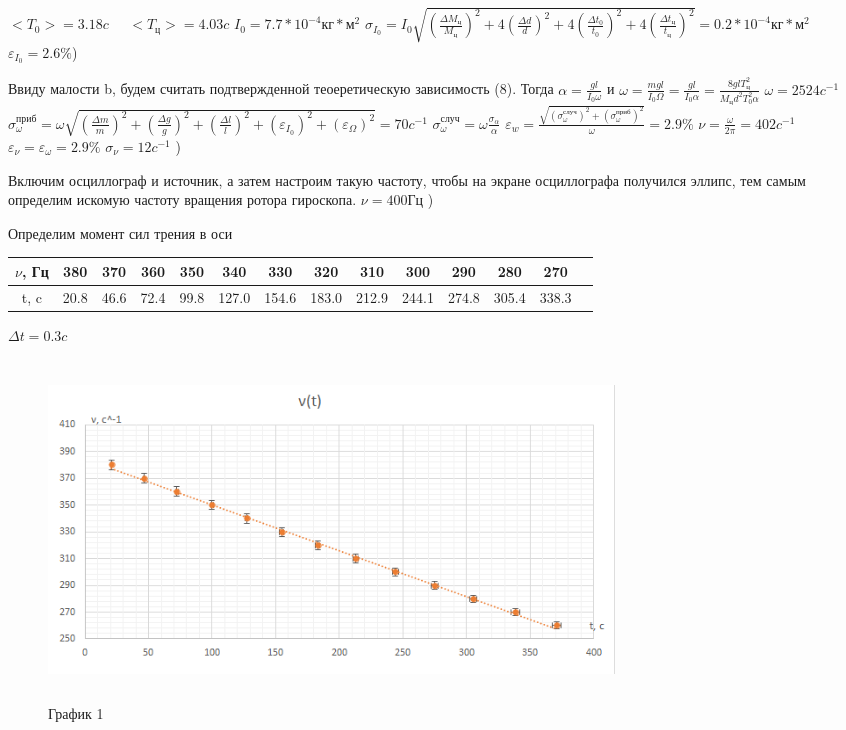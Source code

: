 \documentclass[12pt,a4paper]{article}
\begin{document}
$<T_{0}> = 3.18c \;\;\;\;\; <T_{\text{ц}}> = 4.03 c$ \hfill \break
$I_{0}=7.7*10^{-4}\text{кг}*\text{м}^2$ \hfill \break
$\sigma_{I_{0}}=I_{0}\sqrt{(\frac{\Delta{M_{\text{ц}}}}{M_{\text{ц}}})^2+4(\frac{\Delta{d}}{d})^2+4(\frac{\Delta{t_{0}}}{t_{0}})^2+4(\frac{\Delta{t_{\text{ц}}}}{t_{\text{ц}}})^2}=0.2*10^{-4}\text{кг}*\text{м}^2$ \hfill \break
$\varepsilon_{I_{0}}=2.6\%$\hfill \break {}) \par Ввиду малости b, будем считать подтвержденной теоеретическую зависимость (8). Тогда $\alpha=\frac{gl}{I_{\text{0}}\omega}$ и $\omega=\frac{mgl}{I_{\text{0}}\Omega}=\frac{gl}{I_{\text{0}}\alpha}=\frac{8glT^{2}_{\text{ц}}}{M_{\text{ц}}d^{2}T^{2}_{0}\alpha}$ \hfill \break
$\omega=2524 c^{-1}$ \hfill \break
$\sigma^{\text{приб}}_{\omega}=\omega\sqrt{(\frac{\Delta{m}}{m})^2+(\frac{\Delta{g}}{g})^2+(\frac{\Delta{l}}{l})^2+(\varepsilon_{I_{0}})^2+(\varepsilon_{\Omega})^2}=70 c^{-1}$ \hfill \break
$\sigma^{\text{случ}}_{\omega}=\omega\frac{\sigma_{\alpha}}{\alpha}$ \hfill \break
$\varepsilon_{w}=\frac{\sqrt{(\sigma^{\text{случ}}_{\omega})^2+(\sigma^{\text{приб}}_{\omega})^2}}{\omega}=2.9\%$
$\nu=\frac{\omega}{2\pi}=402 c^{-1}$ \hfill \break
$\varepsilon_{\nu}=\varepsilon_{\omega} = 2.9\%$ \hfill \break
$\sigma_{\nu}=12 c^{-1}$ \hfill {})\par Включим осциллограф и источник, а затем настроим такую частоту, чтобы на экране осциллографа получился эллипс, тем самым определим искомую частоту вращения ротора гироскопа. \hfill \break
$\nu=400\text{Гц}$ \hfill {})\par Определим момент сил трения в оси \hfill \break
\begin{tabular}{|c|c|c|c|c|c|c|c|c|c|c|c|c|c|}
\hline 
$\nu$, Гц & 380 & 370 & 360 & 350 & 340 & 330 & 320 & 310 & 300 & 290 & 280 & 270 \\ 
\hline 
t, c & 20.8 & 46.6 & 72.4 & 99.8 & 127.0 & 154.6 & 183.0 & 212.9 & 244.1 & 274.8 & 305.4 & 338.3 \\ 
\hline 
\end{tabular} 
$\Delta{t}=0.3c$
\begin{figure}[H]
\centering
\includegraphics[width=15cm, height=9cm]{1.2.5_gr_2}
\caption{График 1}
\label{gr:2}
\end{figure}
\end{document}
